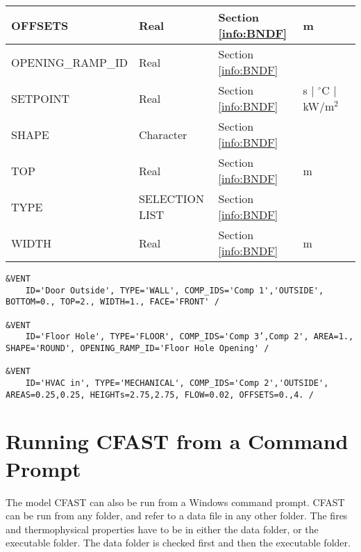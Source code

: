\begin{longtable}{@{\extracolsep{\fill}}|l|l|l|l|l|}
{\ct OFFSETS}         & Real  	& Section \ref{info:BNDF}                 & m                           &                 \\ \hline
{\ct OPENING\_RAMP\_ID}   & Real  	& Section \ref{info:BNDF}                 &                             &                 \\ \hline
{\ct SETPOINT}            & Real  	& Section \ref{info:BNDF}                 & s $\mid$ $^\circ$C $\mid$ kW/m$^2$ &                 \\ \hline
{\ct SHAPE}     	  & Character   & Section \ref{info:BNDF}                 &                             &                 \\ \hline
{\ct TOP}                 & Real  	& Section \ref{info:BNDF}                 & m                           &                 \\ \hline
{\ct TYPE}                & {\ct SELECTION LIST}   & Section \ref{info:BNDF}                 &                             &                 \\ \hline
{\ct WIDTH}               & Real  	& Section \ref{info:BNDF}                 & m                           &                 \\ \hline
\end{longtable}

\vspace{\baselineskip}

\begin{lstlisting}
&VENT 
	ID='Door Outside', TYPE='WALL', COMP_IDS='Comp 1','OUTSIDE', BOTTOM=0., TOP=2., WIDTH=1., FACE='FRONT' / 

&VENT 
	ID='Floor Hole', TYPE='FLOOR', COMP_IDS='Comp 3’,Comp 2', AREA=1., SHAPE='ROUND', OPENING_RAMP_ID='Floor Hole Opening' /

&VENT 
	ID='HVAC in', TYPE='MECHANICAL', COMP_IDS='Comp 2','OUTSIDE', AREAS=0.25,0.25, HEIGHTs=2.75,2.75, FLOW=0.02, OFFSETS=0.,4. /
\end{lstlisting}



\chapter{Running CFAST from a Command Prompt}

The model CFAST can also be run from a Windows command prompt.  CFAST can be run from any folder, and refer to a data file in any other folder. The fires and thermophysical properties have to be in either the data folder, or the executable folder. The data folder is checked first and then the executable folder.

